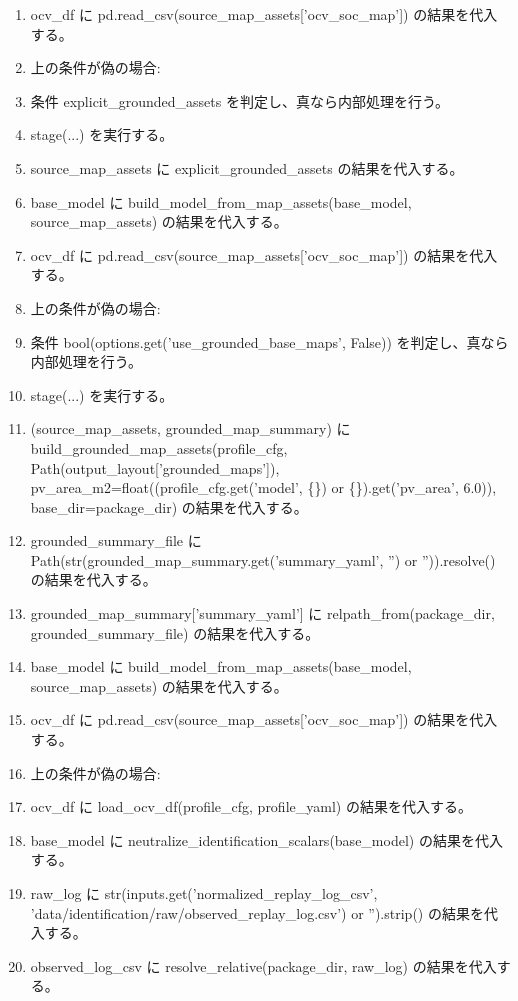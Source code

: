 \documentclass[a4paper,11pt]{article}
\begin{document}
\begin{enumerate}[leftmargin=1.8em]
\item   ocv\_df に pd.read\_csv(source\_map\_assets['ocv\_soc\_map']) の結果を代入する。
\item   上の条件が偽の場合:
\item   条件 explicit\_grounded\_assets を判定し、真なら内部処理を行う。
\item     stage(...) を実行する。
\item     source\_map\_assets に explicit\_grounded\_assets の結果を代入する。
\item     base\_model に build\_model\_from\_map\_assets(base\_model, source\_map\_assets) の結果を代入する。
\item     ocv\_df に pd.read\_csv(source\_map\_assets['ocv\_soc\_map']) の結果を代入する。
\item     上の条件が偽の場合:
\item     条件 bool(options.get('use\_grounded\_base\_maps', False)) を判定し、真なら内部処理を行う。
\item       stage(...) を実行する。
\item       (source\_map\_assets, grounded\_map\_summary) に build\_grounded\_map\_assets(profile\_cfg, Path(output\_layout['grounded\_maps']), pv\_area\_m2=float((profile\_cfg.get('model', \{\}) or \{\}).get('pv\_area', 6.0)), base\_dir=package\_dir) の結果を代入する。
\item       grounded\_summary\_file に Path(str(grounded\_map\_summary.get('summary\_yaml', '') or '')).resolve() の結果を代入する。
\item       grounded\_map\_summary['summary\_yaml'] に relpath\_from(package\_dir, grounded\_summary\_file) の結果を代入する。
\item       base\_model に build\_model\_from\_map\_assets(base\_model, source\_map\_assets) の結果を代入する。
\item       ocv\_df に pd.read\_csv(source\_map\_assets['ocv\_soc\_map']) の結果を代入する。
\item       上の条件が偽の場合:
\item       ocv\_df に load\_ocv\_df(profile\_cfg, profile\_yaml) の結果を代入する。
\item base\_model に neutralize\_identification\_scalars(base\_model) の結果を代入する。
\item raw\_log に str(inputs.get('normalized\_replay\_log\_csv', 'data/identification/raw/observed\_replay\_log.csv') or '').strip() の結果を代入する。
\item observed\_log\_csv に resolve\_relative(package\_dir, raw\_log) の結果を代入する。

\end{enumerate}
\end{document}
